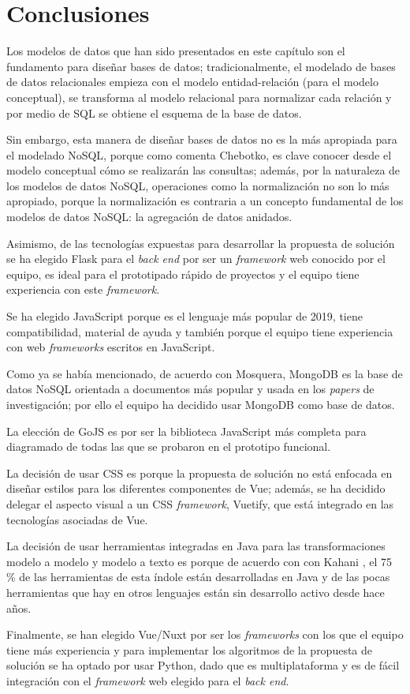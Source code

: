 \newpage\section{Conclusiones}\label{ref:conclusiones-cap3}


Los modelos de datos que han sido presentados en este capítulo son el fundamento para diseñar bases de datos; tradicionalmente, el modelado de bases de datos relacionales empieza con el modelo entidad-relación (para el modelo conceptual), se transforma al modelo relacional para normalizar cada relación y por medio de SQL se obtiene el esquema de la base de datos. 


Sin embargo, esta manera de diseñar bases de datos no es la más apropiada para el modelado NoSQL, porque como comenta Chebotko\cite{chebotko_big_2015}, es clave conocer desde el modelo conceptual cómo se realizarán las consultas; además, por la naturaleza de los modelos de datos NoSQL, operaciones como la normalización no son lo más apropiado, porque la normalización es contraria a un concepto fundamental de los modelos de datos NoSQL: la agregación de datos anidados.

Asimismo, de las tecnologías expuestas para desarrollar la propuesta de solución se ha elegido Flask para el \textit{back end} por ser un \textit{framework} web conocido por el equipo, es ideal para el prototipado rápido de proyectos y el equipo tiene experiencia con este \textit{framework}.


Se ha elegido JavaScript porque es el lenguaje más popular de 2019, tiene compatibilidad, material de ayuda y también porque el equipo tiene experiencia con web \textit{frameworks} escritos en JavaScript.


Como ya se había mencionado, de acuerdo con Mosquera\cite{martinez-mosquera_modeling_2020}, MongoDB es la base de datos NoSQL orientada a documentos más popular y usada en los \textit{papers} de investigación; por ello el equipo ha decidido usar MongoDB como base de datos.


La elección de GoJS es por ser la biblioteca JavaScript más completa para diagramado de todas las que se probaron en el prototipo funcional.



La decisión de usar CSS es porque la propuesta de solución no está enfocada en diseñar estilos para los diferentes componentes de Vue; además, se ha decidido delegar el aspecto visual a un CSS \textit{framework}, Vuetify, que está integrado en las tecnologías asociadas de Vue.


La decisión de usar herramientas integradas en Java para las transformaciones modelo a modelo y modelo a texto es porque de acuerdo con con Kahani \cite{kahani_survey_2019}, el 75 \% de las herramientas de esta índole están desarrolladas en Java y de las pocas herramientas que hay en otros lenguajes están sin desarrollo activo desde hace años. 


Finalmente, se han elegido Vue/Nuxt por ser los \textit{frameworks} con los que el equipo tiene más experiencia y para implementar los algoritmos de la propuesta de solución se ha optado por usar Python, dado que es multiplataforma y es de fácil integración con el \textit{framework} web elegido para el \textit{back end}.
